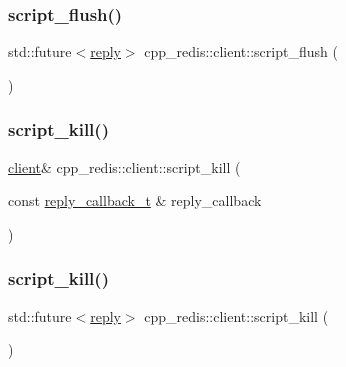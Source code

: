\mbox{\label{classcpp__redis_1_1client_a44f5707f8487285d69737b7857c436d7}} 
\subsubsection{\texorpdfstring{script\+\_\+flush()}{script\_flush()}\hspace{0.1cm}{\footnotesize\ttfamily [2/2]}}
{\footnotesize\ttfamily std\+::future$<$\hyperlink{classcpp__redis_1_1reply}{reply}$>$ cpp\+\_\+redis\+::client\+::script\+\_\+flush (\begin{DoxyParamCaption}{ }\end{DoxyParamCaption})}

\mbox{\label{classcpp__redis_1_1client_a65abffc1a1669931d5b6715f354b59af}} 
\subsubsection{\texorpdfstring{script\+\_\+kill()}{script\_kill()}\hspace{0.1cm}{\footnotesize\ttfamily [1/2]}}
{\footnotesize\ttfamily \hyperlink{classcpp__redis_1_1client}{client}\& cpp\+\_\+redis\+::client\+::script\+\_\+kill (\begin{DoxyParamCaption}\item[{const \hyperlink{classcpp__redis_1_1client_a061a1140d36d2eaeda82b09a0bb3f9f2}{reply\+\_\+callback\+\_\+t} \&}]{reply\+\_\+callback }\end{DoxyParamCaption})}

\mbox{\label{classcpp__redis_1_1client_a35286249f2405afa0cf412472c1067b4}} 
\subsubsection{\texorpdfstring{script\+\_\+kill()}{script\_kill()}\hspace{0.1cm}{\footnotesize\ttfamily [2/2]}}
{\footnotesize\ttfamily std\+::future$<$\hyperlink{classcpp__redis_1_1reply}{reply}$>$ cpp\+\_\+redis\+::client\+::script\+\_\+kill (\begin{DoxyParamCaption}{ }\end{DoxyParamCaption})}

